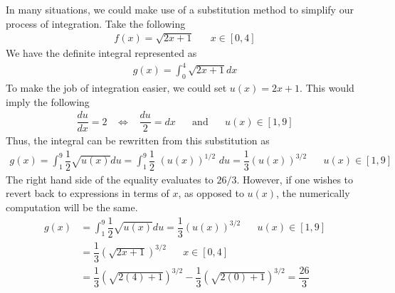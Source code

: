 \begin{example}
In many situations, we could make use of a substitution method to simplify our process of integration. Take the following
\begin{align*}
    f(x) = \sqrt{2x + 1} \hspace{20pt} x \in [0, 4]
\end{align*}
We have the definite integral represented as 
\begin{align*}
    g(x) = \int_{0}^{4} \sqrt{2x + 1} dx
\end{align*}
To make the job of integration easier, we could set $u(x) = 2x + 1$. This would imply the following
\begin{align*}
    \dfrac{du}{dx} = 2 \hspace{10pt} \Longleftrightarrow \hspace{10pt} \dfrac{du}{2} = dx \hspace{20pt} \text{and} \hspace{20pt} u(x) \in [1, 9]
\end{align*}
Thus, the integral can be rewritten from this substitution as
\begin{align*}
    g(x) = \int_{1}^{9} \dfrac{1}{2}\sqrt{u(x)} du = \int_{1}^{9} \dfrac{1}{2} \hspace{4pt} (u(x))^{1/2} \hspace{4pt} du = \dfrac{1}{3} (u(x))^{3/2} \hspace{20pt} u(x) \in [1, 9]
\end{align*}
The right hand side of the equality evaluates to $26/3$. However, if one wishes to revert back to expressions in terms of $x$, as opposed to $u(x)$, the numerically computation will be the same.
\begin{align*}
    g(x) &= \int_{1}^{9} \dfrac{1}{2}\sqrt{u(x)} du = \dfrac{1}{3} (u(x))^{3/2} \hspace{20pt} u(x) \in [1, 9]\\[2ex]
    &= \dfrac{1}{3} (\sqrt{2x + 1})^{3/2} \hspace{20pt} x \in [0, 4]\\[2ex]
    &= \dfrac{1}{3} (\sqrt{2(4) + 1})^{3/2} - \dfrac{1}{3} (\sqrt{2(0) + 1})^{3/2} = \dfrac{26}{3}
\end{align*}
\end{example}


